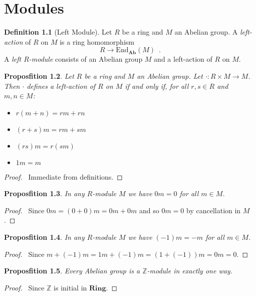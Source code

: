 \documentclass{book}
\let\qed\relax
\newtheorem{prop}{Proposfition}[chapter]
\theoremstyle{definition}
\newtheorem{df}[prop]{Definition}
\newcommand{\Ab}{\ensuremath{\mathbf{Ab}}}
\newcommand{\End}[2]{\ensuremath{\mathrm{End}_{#1} \left( {#2} \right)}}
\newcommand{\Ring}{\ensuremath{\mathbf{Ring}}}
\begin{document}
\chapter{Modules}

\begin{df}[Left Module]
Let $R$ be a ring and $M$ an Abelian group. A \emph{left-action} of $R$ on $M$ is a ring homomorphism
\[ R \rightarrow \End{\Ab}{M} \enspace . \]
A \emph{left $R$-module} consists of an Abelian group $M$ and a left-action of $R$ on $M$.
\end{df}

\begin{prop}
Let $R$ be a ring and $M$ an Abelian group. Let $\cdot : R \times M \rightarrow M$. Then $\cdot$ defines a left-action of $R$ on $M$ if and only if, for all $r,s \in R$ and $m,n \in M$:
\begin{itemize}
\item $r(m+n) = rm + rn$
\item $(r+s)m = rm + sm$
\item $(rs)m = r(sm)$
\item $1m = m$
\end{itemize}
\end{prop}

\begin{proof}
\pf\ Immediate from definitions. \qed
\end{proof}

\begin{prop}
In any $R$-module $M$ we have $0m= 0$ for all $m \in M$.
\end{prop}

\begin{proof}
\pf\ Since $0m = (0+0)m = 0m+0m$ and so $0m = 0$ by cancellation in $M$. \qed
\end{proof}

\begin{prop}
In any $R$-module $M$ we have $(-1)m = -m$ for all $m \in M$.
\end{prop}

\begin{proof}
\pf\ Since $m + (-1)m = 1m + (-1)m = (1+(-1))m = 0m = 0$. \qed
\end{proof}

\begin{prop}
Every Abelian group is a $\mathbb{Z}$-module in exactly one way.
\end{prop}

\begin{proof}
\pf\ Since $\mathbb{Z}$ is initial in $\Ring$. \qed
\end{proof}
\end{document}

